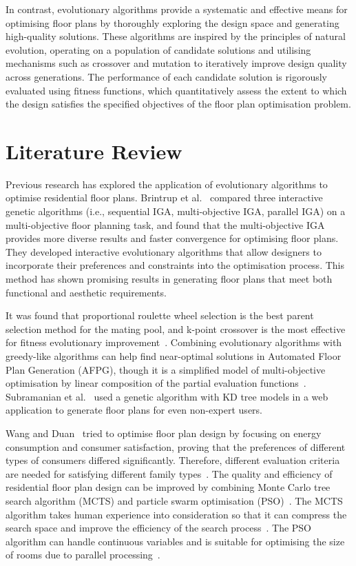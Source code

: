 \documentclass[]{article}
\begin{document}
In contrast, evolutionary algorithms provide a systematic and effective means for optimising floor plans by thoroughly exploring the design space and generating high-quality solutions. These algorithms are inspired by the principles of natural evolution, operating on a population of candidate solutions and utilising mechanisms such as crossover and mutation to iteratively improve design quality across generations. The performance of each candidate solution is rigorously evaluated using fitness functions, which quantitatively assess the extent to which the design satisfies the specified objectives of the floor plan optimisation problem.

\section{Literature Review}
Previous research has explored the application of evolutionary algorithms to optimise residential floor plans. Brintrup et al.~\cite{10.1007/11732242_56} compared three interactive genetic algorithms (i.e., sequential IGA, multi-objective IGA, parallel IGA) on a multi-objective floor planning task, and found that the multi-objective IGA provides more diverse results and faster convergence for optimising floor plans. They developed interactive evolutionary algorithms that allow designers to incorporate their preferences and constraints into the optimisation process. This method has shown promising results in generating floor plans that meet both functional and aesthetic requirements.

It was found that proportional roulette wheel selection is the best parent selection method for the mating pool, and k-point crossover is the most effective for fitness evolutionary improvement~\cite{7844659}.
Combining evolutionary algorithms with greedy-like algorithms can help find near-optimal solutions in Automated Floor Plan Generation (AFPG), though it is a simplified model of multi-objective optimisation by linear composition of the partial evaluation functions~\cite{doi:10.1177/1478077119832982}. Subramanian et al.~\cite{9675541} used a genetic algorithm with KD tree models in a web application to generate floor plans for even non-expert users.

Wang and Duan~\cite{WANG2023100238} tried to optimise floor plan design by focusing on energy consumption and consumer satisfaction, proving that the preferences of different types of consumers differed significantly. Therefore, different evaluation criteria are needed for satisfying different family types~\cite{WANG2023100238}. The quality and efficiency of residential floor plan design can be improved by combining Monte Carlo tree search algorithm (MCTS) and particle swarm optimisation (PSO)~\cite{YAN2024110546}. The MCTS algorithm takes human experience into consideration so that it can compress the search space and improve the efficiency of the search process~\cite{YAN2024110546}. The PSO algorithm can handle continuous variables and is suitable for optimising the size of rooms due to parallel processing~\cite{YAN2024110546}.
\end{document}
